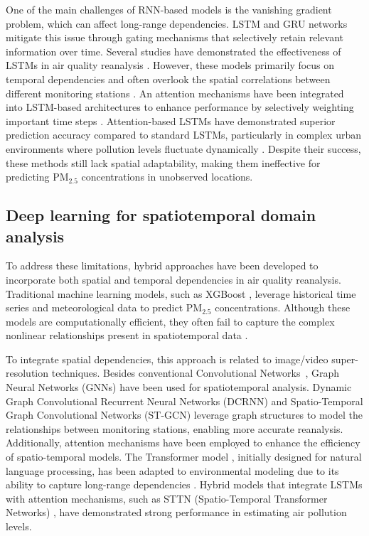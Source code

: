 One of the main challenges of RNN-based models is the vanishing gradient problem, which can affect long-range dependencies. LSTM and GRU networks mitigate this issue through gating mechanisms that selectively retain relevant information over time. Several studies have demonstrated the effectiveness of LSTMs in air quality reanalysis \cite{feng2020deep}. However, these models primarily focus on temporal dependencies and often overlook the spatial correlations between different monitoring stations \cite{zhang2021review}. An attention mechanisms \cite{vaswani2017attention} have been integrated into LSTM-based architectures to enhance performance by selectively weighting important time steps \cite{zhao2022attention}. Attention-based LSTMs have demonstrated superior prediction accuracy compared to standard LSTMs, particularly in complex urban environments where pollution levels fluctuate dynamically \cite{yang2020hybrid}. Despite their success, these methods still lack spatial adaptability, making them ineffective for predicting PM\(_{2.5}\) concentrations in unobserved locations. 

\subsection{Deep learning for spatiotemporal domain analysis}
To address these limitations, hybrid approaches have been developed to incorporate both spatial and temporal dependencies in air quality reanalysis. Traditional machine learning models, such as XGBoost \cite{chen2016xgboost}, leverage historical time series and meteorological data to predict PM\(_{2.5}\) concentrations. Although these models are computationally efficient, they often fail to capture the complex nonlinear relationships present in spatiotemporal data \cite{yan2018spatial}.

To integrate spatial dependencies, 
this approach is related to image/video super-resolution techniques. Besides conventional Convolutional Networks~\cite{sr_1,sr_2,sr_3,sr_4}, Graph Neural Networks (GNNs) have been used for spatiotemporal analysis. Dynamic Graph Convolutional Recurrent Neural Networks (DCRNN) \cite{li2018dcrnn} and Spatio-Temporal Graph Convolutional Networks (ST-GCN) \cite{yan2018spatial} leverage graph structures to model the relationships between monitoring stations, enabling more accurate reanalysis. Additionally, attention mechanisms have been employed to enhance the efficiency of spatio-temporal models. The Transformer model \cite{vaswani2017attention}, initially designed for natural language processing, has been adapted to environmental modeling due to its ability to capture long-range dependencies \cite{xu2020spatio}. Hybrid models that integrate LSTMs with attention mechanisms, such as STTN (Spatio-Temporal Transformer Networks) \cite{xu2020spatio}, have demonstrated strong performance in estimating air pollution levels.

